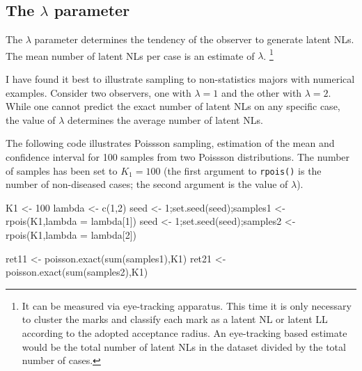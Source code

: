 \documentclass[
]{book}
\newenvironment{Shaded}{\begin{snugshade}}{\end{snugshade}}
\newcommand{\AttributeTok}[1]{\textcolor[rgb]{0.77,0.63,0.00}{#1}}
\newcommand{\DecValTok}[1]{\textcolor[rgb]{0.00,0.00,0.81}{#1}}
\newcommand{\FunctionTok}[1]{\textcolor[rgb]{0.00,0.00,0.00}{#1}}
\newcommand{\NormalTok}[1]{#1}
\newcommand{\OtherTok}[1]{\textcolor[rgb]{0.56,0.35,0.01}{#1}}
\begin{document}
\hypertarget{rsm-summary-lambda-parameter}{%
\subsection{\texorpdfstring{The \(\lambda\) parameter}{The \textbackslash lambda parameter}}\label{rsm-summary-lambda-parameter}}

The \(\lambda\) parameter determines the tendency of the observer to generate latent NLs. The mean number of latent NLs per case is an estimate of \(\lambda\). \footnote{It can be measured via eye-tracking apparatus. This time it is only necessary to cluster the marks and classify each mark as a latent NL or latent LL according to the adopted acceptance radius. An eye-tracking based estimate would be the total number of latent NLs in the dataset divided by the total number of cases.}

I have found it best to illustrate sampling to non-statistics majors with numerical examples. Consider two observers, one with \(\lambda = 1\) and the other with \(\lambda = 2\). While one cannot predict the exact number of latent NLs on any specific case, the value of \(\lambda\) determines the average number of latent NLs.

The following code illustrates Poissson sampling, estimation of the mean and confidence interval for 100 samples from two Poissson distributions. The number of samples has been set to \(K_1=100\) (the first argument to \texttt{rpois()} is the number of non-diseased cases; the second argument is the value of \(\lambda\)).

\begin{Shaded}
\begin{Highlighting}[]
\NormalTok{K1 }\OtherTok{\textless{}{-}} \DecValTok{100}
\NormalTok{lambda }\OtherTok{\textless{}{-}} \FunctionTok{c}\NormalTok{(}\DecValTok{1}\NormalTok{,}\DecValTok{2}\NormalTok{)}
\NormalTok{seed }\OtherTok{\textless{}{-}} \DecValTok{1}\NormalTok{;}\FunctionTok{set.seed}\NormalTok{(seed);samples1 }\OtherTok{\textless{}{-}} \FunctionTok{rpois}\NormalTok{(K1,}\AttributeTok{lambda =}\NormalTok{ lambda[}\DecValTok{1}\NormalTok{])}
\NormalTok{seed }\OtherTok{\textless{}{-}} \DecValTok{1}\NormalTok{;}\FunctionTok{set.seed}\NormalTok{(seed);samples2 }\OtherTok{\textless{}{-}} \FunctionTok{rpois}\NormalTok{(K1,}\AttributeTok{lambda =}\NormalTok{ lambda[}\DecValTok{2}\NormalTok{])}

\NormalTok{ret11 }\OtherTok{\textless{}{-}} \FunctionTok{poisson.exact}\NormalTok{(}\FunctionTok{sum}\NormalTok{(samples1),K1)}
\NormalTok{ret21 }\OtherTok{\textless{}{-}} \FunctionTok{poisson.exact}\NormalTok{(}\FunctionTok{sum}\NormalTok{(samples2),K1)}
\end{Highlighting}
\end{Shaded}
\end{document}
